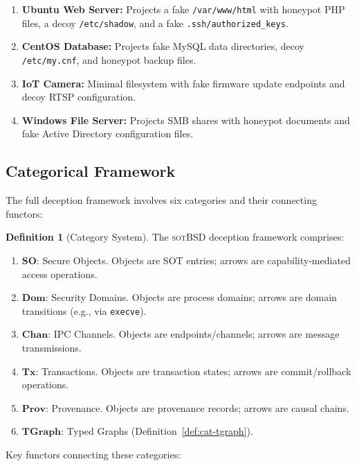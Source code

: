 \documentclass[11pt,a4paper]{article}
\theoremstyle{definition}
\newtheorem{definition}{Definition}[section]
\theoremstyle{remark}
\newcommand{\sotbsd}{\textsc{sotBSD}}
\newcommand{\cat}[1]{\ensuremath{\mathbf{#1}}}
\begin{document}
\begin{enumerate}
\item \textbf{Ubuntu Web Server:} Projects a fake
  \texttt{/var/www/html} with honeypot PHP files, a decoy
  \texttt{/etc/shadow}, and a fake \texttt{.ssh/authorized\_keys}.

\item \textbf{CentOS Database:} Projects fake MySQL data directories,
  decoy \texttt{/etc/my.cnf}, and honeypot backup files.

\item \textbf{IoT Camera:} Minimal filesystem with fake firmware
  update endpoints and decoy RTSP configuration.

\item \textbf{Windows File Server:} Projects SMB shares with honeypot
  documents and fake Active Directory configuration files.
\end{enumerate}

\subsection{Categorical Framework}
\label{sec:deception-categories}

The full deception framework involves six categories and their
connecting functors:

\begin{definition}[Category System]
\label{def:cat-system}
The \sotbsd{} deception framework comprises:
\begin{enumerate}[label=(\roman*)]
\item $\cat{SO}$: Secure Objects. Objects are SOT entries; arrows are
  capability-mediated access operations.
\item $\cat{Dom}$: Security Domains. Objects are process domains;
  arrows are domain transitions (e.g., via \texttt{execve}).
\item $\cat{Chan}$: IPC Channels. Objects are endpoints/channels;
  arrows are message transmissions.
\item $\cat{Tx}$: Transactions. Objects are transaction states; arrows
  are commit/rollback operations.
\item $\cat{Prov}$: Provenance. Objects are provenance records; arrows
  are causal chains.
\item $\cat{TGraph}$: Typed Graphs (Definition~\ref{def:cat-tgraph}).
\end{enumerate}
\end{definition}

Key functors connecting these categories:
\end{document}
